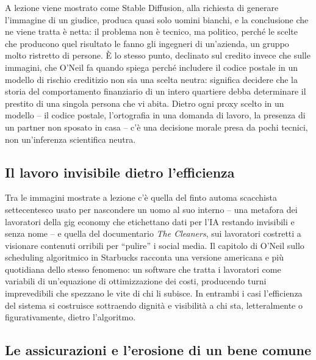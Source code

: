 \documentclass[a4paper,11pt]{article}
\begin{document}
A lezione viene mostrato come Stable Diffusion, alla richiesta di generare l'immagine di un giudice, produca quasi solo uomini bianchi, e la conclusione che ne viene tratta è netta: il problema non è tecnico, ma politico, perché le scelte che producono quel risultato le fanno gli ingegneri di un'azienda, un gruppo molto ristretto di persone. È lo stesso punto, declinato sul credito invece che sulle immagini, che O'Neil fa quando spiega perché includere il codice postale in un modello di rischio creditizio non sia una scelta neutra: significa decidere che la storia del comportamento finanziario di un intero quartiere debba determinare il prestito di una singola persona che vi abita. Dietro ogni proxy scelto in un modello -- il codice postale, l'ortografia in una domanda di lavoro, la presenza di un partner non sposato in casa -- c'è una decisione morale presa da pochi tecnici, non un'inferenza scientifica neutra.

\subsection{Il lavoro invisibile dietro l'efficienza}

Tra le immagini mostrate a lezione c'è quella del finto automa scacchista settecentesco usato per nascondere un uomo al suo interno -- una metafora dei lavoratori della gig economy che etichettano dati per l'IA restando invisibili e senza nome -- e quella del documentario \emph{The Cleaners}, sui lavoratori costretti a visionare contenuti orribili per ``pulire'' i social media. Il capitolo di O'Neil sullo scheduling algoritmico in Starbucks racconta una versione americana e più quotidiana dello stesso fenomeno: un software che tratta i lavoratori come variabili di un'equazione di ottimizzazione dei costi, producendo turni imprevedibili che spezzano le vite di chi li subisce. In entrambi i casi l'efficienza del sistema si costruisce sottraendo dignità e visibilità a chi sta, letteralmente o figurativamente, dietro l'algoritmo.

\subsection{Le assicurazioni e l'erosione di un bene comune}
\end{document}
